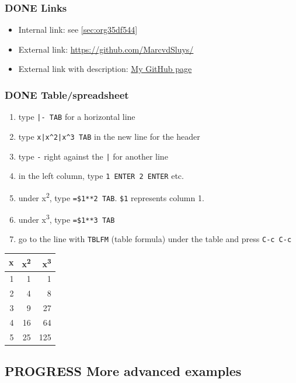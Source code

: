 \documentclass[11pt]{article}
\begin{document}
\subsubsection{{\bfseries\sffamily DONE} Links}
\label{sec:org0e30ab0}
\begin{itemize}
\item Internal link: see \ref{sec:org35df544}
\item External link: \url{https://github.com/MarcvdSluys/}
\item External link with description: \href{https://github.com/MarcvdSluys/}{My GitHub page}
\end{itemize}

\subsubsection{{\bfseries\sffamily DONE} Table/spreadsheet}
\label{sec:org6462786}
\begin{enumerate}
\item type \texttt{|- TAB} for a horizontal line
\item type \texttt{x|x\textasciicircum{}2|x\textasciicircum{}3 TAB} in the new line for the header
\item type \texttt{-} right against the \texttt{|} for another line
\item in the left column, type \texttt{1 ENTER 2 ENTER} etc.
\item under x\textsuperscript{2}, type \texttt{=\$1**2 TAB}.  \texttt{\$1} represents column 1.
\item under x\textsuperscript{3}, type \texttt{=\$1**3 TAB}
\item go to the line with \texttt{TBLFM} (table formula) under the table and press \texttt{C-c C-c}
\end{enumerate}

\begin{center}
\begin{tabular}{rrr}
\hline
x & x\textsuperscript{2} & x\textsuperscript{3}\\
\hline
1 & 1 & 1\\
2 & 4 & 8\\
3 & 9 & 27\\
4 & 16 & 64\\
5 & 25 & 125\\
\hline
\end{tabular}
\end{center}


\subsection{{\bfseries\sffamily PROGRESS} More advanced examples}
\label{sec:orgcabe173}
\end{document}
